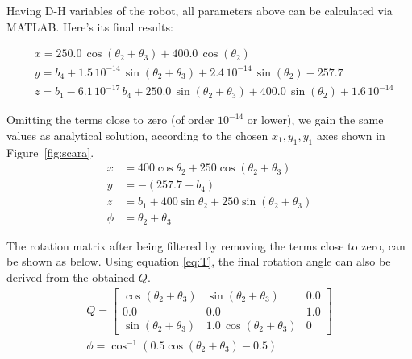 \documentclass[conference]{IEEEtran}
\begin{document}
Having D-H variables of the robot, all parameters above can be calculated via MATLAB. Here's its final results:
\begin{small}
    \begin{align*}
         & x = 250.0\,\cos\left(\theta _{2}+\theta _{3}\right)+400.0\,\cos\left(\theta _{2}\right)                                              \\
         & y = b_{4}+1.5\,{10}^{-14}\,\sin\left(\theta _{2}+\theta _{3}\right)+2.4\,{10}^{-14}\,\sin\left(\theta _{2}\right)-257.7              \\
         & z = b_{1}-6.1\,{10}^{-17}\,b_{4}+250.0\,\sin\left(\theta _{2}+\theta _{3}\right)+400.0\,\sin\left(\theta _{2}\right)+1.6\,{10}^{-14}
    \end{align*}
\end{small}

Omitting the terms close to zero (of order $10^{-14}$ or lower), we gain the same values as analytical solution, according to the chosen $x_1, y_1, y_1$ axes shown in Figure~\ref{fig:scara}.
\begin{align}
    x    & = 400 \cos \theta_2 + 250 \cos (\theta_2 + \theta_3)    \label{eq:x}    \\
    y    & = - (257.7 - b_4)                                        \label{eq:y}   \\
    z    & = b_1 + 400 \sin \theta_2 + 250 \sin (\theta_2 + \theta_3) \label{eq:z} \\
    \phi & = \theta_2 + \theta_3 \label{eq:phi1}
\end{align}

The rotation matrix after being filtered by removing the terms close to zero, can be shown as below. Using equation \ref{eq:T}, the final rotation angle can also be derived from the obtained $Q$.
\begin{gather}
    Q = \begin{bmatrix}
        \cos\left(\theta _{2}+\theta _{3}\right) & \sin\left(\theta _{2}+\theta _{3}\right)      & 0.0 \\
        0.0                                      & 0.0                                           & 1.0 \\
        \sin\left(\theta _{2}+\theta _{3}\right) & 1.0\,\cos\left(\theta _{2}+\theta _{3}\right) & 0
    \end{bmatrix} \\
    \phi = \cos^{-1} \left(0.5 \cos \left(\theta_2 + \theta_3\right) - 0.5\right) \label{eq:phi2}
\end{gather}
\end{document}
